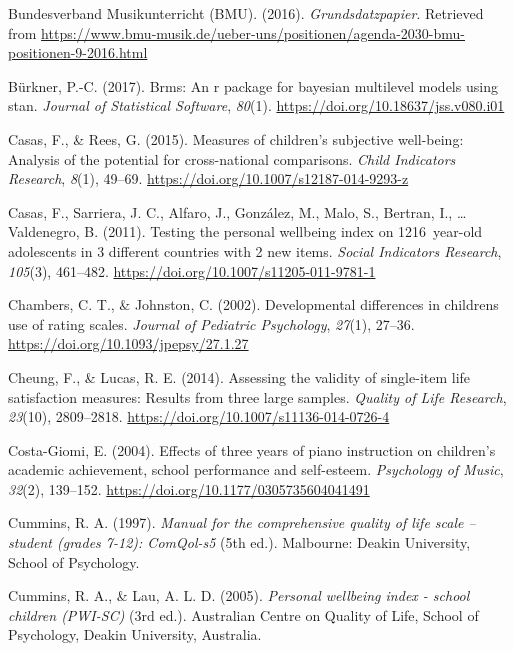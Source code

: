 \documentclass[a4, 12pt]{article}
\begin{document}
\leavevmode\hypertarget{ref-BundesverbandMusikunterricht}{}%
Bundesverband Musikunterricht (BMU). (2016). \emph{Grundsdatzpapier}. Retrieved from \url{https://www.bmu-musik.de/ueber-uns/positionen/agenda-2030-bmu-positionen-9-2016.html}

\leavevmode\hypertarget{ref-Buerkner2017}{}%
Bürkner, P.-C. (2017). Brms: An r package for bayesian multilevel models using stan. \emph{Journal of Statistical Software}, \emph{80}(1). \url{https://doi.org/10.18637/jss.v080.i01}

\leavevmode\hypertarget{ref-Casas2015}{}%
Casas, F., \& Rees, G. (2015). Measures of children's subjective well-being: Analysis of the potential for cross-national comparisons. \emph{Child Indicators Research}, \emph{8}(1), 49--69. \url{https://doi.org/10.1007/s12187-014-9293-z}

\leavevmode\hypertarget{ref-Casas2011}{}%
Casas, F., Sarriera, J. C., Alfaro, J., González, M., Malo, S., Bertran, I., \ldots{} Valdenegro, B. (2011). Testing the personal wellbeing index on 1216~year-old adolescents in 3 different countries with 2 new items. \emph{Social Indicators Research}, \emph{105}(3), 461--482. \url{https://doi.org/10.1007/s11205-011-9781-1}

\leavevmode\hypertarget{ref-Johnston2002}{}%
Chambers, C. T., \& Johnston, C. (2002). Developmental differences in childrens use of rating scales. \emph{Journal of Pediatric Psychology}, \emph{27}(1), 27--36. \url{https://doi.org/10.1093/jpepsy/27.1.27}

\leavevmode\hypertarget{ref-Cheung2014}{}%
Cheung, F., \& Lucas, R. E. (2014). Assessing the validity of single-item life satisfaction measures: Results from three large samples. \emph{Quality of Life Research}, \emph{23}(10), 2809--2818. \url{https://doi.org/10.1007/s11136-014-0726-4}

\leavevmode\hypertarget{ref-CostaGiomi2004}{}%
Costa-Giomi, E. (2004). Effects of three years of piano instruction on children's academic achievement, school performance and self-esteem. \emph{Psychology of Music}, \emph{32}(2), 139--152. \url{https://doi.org/10.1177/0305735604041491}

\leavevmode\hypertarget{ref-Cummins1997}{}%
Cummins, R. A. (1997). \emph{Manual for the comprehensive quality of life scale -- student (grades 7-12): ComQol-s5} (5th ed.). Malbourne: Deakin University, School of Psychology.

\leavevmode\hypertarget{ref-Cummins2005}{}%
Cummins, R. A., \& Lau, A. L. D. (2005). \emph{Personal wellbeing index - school children (PWI-SC)} (3rd ed.). Australian Centre on Quality of Life, School of Psychology, Deakin University, Australia.
\end{document}
